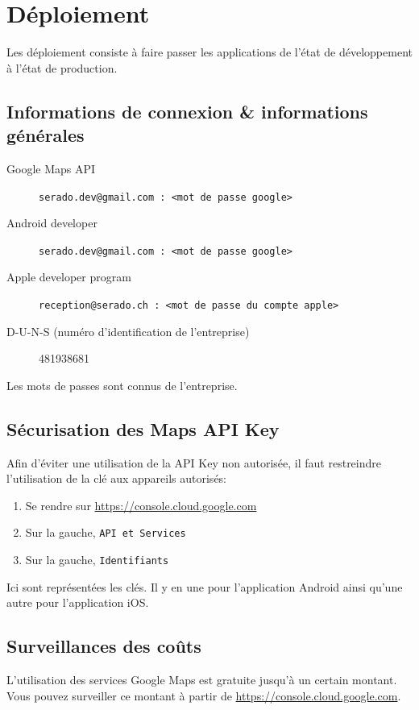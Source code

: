 \documentclass[french]{report}
\begin{document}
\chapter{Déploiement}

Les déploiement consiste à faire passer les applications de l'état de développement
à l'état de production.

\section{Informations de connexion \& informations générales}
\begin{description}
    \item[Google Maps API] \verb|serado.dev@gmail.com : <mot de passe google>|
    \item[Android developer] \verb|serado.dev@gmail.com : <mot de passe google>|
    \item[Apple developer program] \verb|reception@serado.ch : <mot de passe du compte apple>| 
    \item[D-U-N-S (numéro d'identification de l'entreprise)] 481938681
\end{description}

Les mots de passes sont connus de l'entreprise.

\section{Sécurisation des Maps API Key}\label{sec:api_key}
Afin d'éviter une utilisation de la API Key non autorisée, il faut restreindre
l'utilisation de la clé aux appareils autorisés:
\begin{enumerate}
    \item Se rendre sur \url{https://console.cloud.google.com}\label{cloud}
    \item Sur la gauche, \verb|API et Services|
    \item Sur la gauche, \verb|Identifiants|
\end{enumerate}
Ici sont représentées les clés. Il y en une pour l'application Android ainsi qu'une
autre pour l'application iOS.

\section{Surveillances des coûts}
L'utilisation des services Google Maps est gratuite jusqu'à un certain montant.
Vous pouvez surveiller ce montant à partir de \url{https://console.cloud.google.com}.
\end{document}
